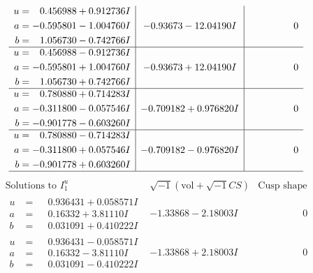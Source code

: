 \documentclass[1p]{elsarticle_modified}
\theoremstyle{definition}
\newcommand{\I}{\sqrt{-1}}
\begin{document}
$$\begin{array}{c|c|c}
\begin{aligned}
u &= \phantom{-}0.456988 + 0.912736 I \\
a &= -0.595801 - 1.004760 I \\
b &= \phantom{-}1.056730 - 0.742766 I\end{aligned}
 & -0.93673 - 12.04190 I & \phantom{-0.000000 } 0 \\ \hline\begin{aligned}
u &= \phantom{-}0.456988 - 0.912736 I \\
a &= -0.595801 + 1.004760 I \\
b &= \phantom{-}1.056730 + 0.742766 I\end{aligned}
 & -0.93673 + 12.04190 I & \phantom{-0.000000 } 0 \\ \hline\begin{aligned}
u &= \phantom{-}0.780880 + 0.714283 I \\
a &= -0.311800 - 0.057546 I \\
b &= -0.901778 - 0.603260 I\end{aligned}
 & -0.709182 + 0.976820 I & \phantom{-0.000000 } 0 \\ \hline\begin{aligned}
u &= \phantom{-}0.780880 - 0.714283 I \\
a &= -0.311800 + 0.057546 I \\
b &= -0.901778 + 0.603260 I\end{aligned}
 & -0.709182 - 0.976820 I & \phantom{-0.000000 } 0\\
 \hline 
 \end{array}$$\newpage$$\begin{array}{c|c|c}  
\text{Solutions to }I^u_{1}& \I (\text{vol} + \sqrt{-1}CS) & \text{Cusp shape}\\
 \hline 
\begin{aligned}
u &= \phantom{-}0.936431 + 0.058571 I \\
a &= \phantom{-}0.16332 + 3.81110 I \\
b &= \phantom{-}0.031091 + 0.410222 I\end{aligned}
 & -1.33868 - 2.18003 I & \phantom{-0.000000 } 0 \\ \hline\begin{aligned}
u &= \phantom{-}0.936431 - 0.058571 I \\
a &= \phantom{-}0.16332 - 3.81110 I \\
b &= \phantom{-}0.031091 - 0.410222 I\end{aligned}
 & -1.33868 + 2.18003 I & \phantom{-0.000000 } 0 \\ \hline\begin{aligned}

\end{aligned}
\end{array}$$
\end{document}
